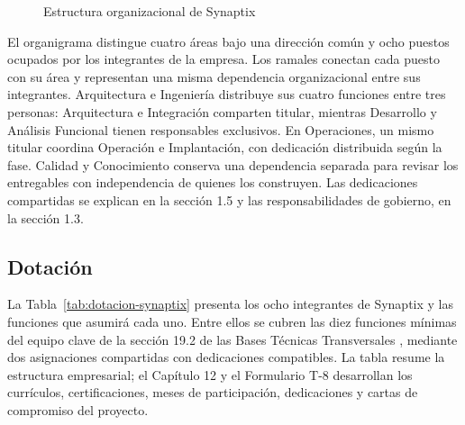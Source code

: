 \begin{figure}[H]
  \caption{Estructura organizacional de Synaptix}
  \label{fig:organigrama-synaptix}
\end{figure}

El organigrama distingue cuatro áreas bajo una dirección común y ocho puestos ocupados por los integrantes de la empresa. Los ramales conectan cada puesto con su área y representan una misma dependencia organizacional entre sus integrantes. Arquitectura e Ingeniería distribuye sus cuatro funciones entre tres personas: Arquitectura e Integración comparten titular, mientras Desarrollo y Análisis Funcional tienen responsables exclusivos. En Operaciones, un mismo titular coordina Operación e Implantación, con dedicación distribuida según la fase. Calidad y Conocimiento conserva una dependencia separada para revisar los entregables con independencia de quienes los construyen. Las dedicaciones compartidas se explican en la sección 1.5 y las responsabilidades de gobierno, en la sección 1.3.

\subsection{Dotación}

La Tabla~\ref{tab:dotacion-synaptix} presenta los ocho integrantes de Synaptix y las funciones que asumirá cada uno. Entre ellos se cubren las diez funciones mínimas del equipo clave de la sección 19.2 de las Bases Técnicas Transversales \parencite[sec.~19.2, pp.~33--34]{bases-transversales}, mediante dos asignaciones compartidas con dedicaciones compatibles. La tabla resume la estructura empresarial; el Capítulo 12 y el Formulario T-8 desarrollan los currículos, certificaciones, meses de participación, dedicaciones y cartas de compromiso del proyecto.


